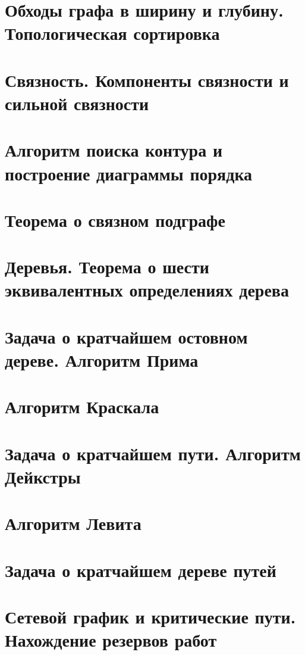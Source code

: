 \documentclass[12pt, fleqn]{article}
\begin{document}
\section{Обходы графа в ширину и глубину. Топологическая сортировка}


\section{Связность. Компоненты связности и сильной связности}


\section{Алгоритм поиска контура и построение диаграммы порядка}


\section{Теорема о связном подграфе}


\section{Деревья. Теорема о шести эквивалентных определениях дерева}


\section{Задача о кратчайшем остовном дереве. Алгоритм Прима}


\section{Алгоритм Краскала}


\section{Задача о кратчайшем пути. Алгоритм Дейкстры}


\section{Алгоритм Левита}


\section{Задача о кратчайшем дереве путей}


\section{Сетевой график и критические пути. Нахождение резервов работ}
\end{document}

